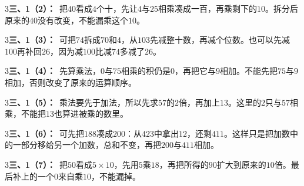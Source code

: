 \documentclass[multi=snippet,border={5bp 20bp 5bp 5bp}]{standalone}
\newenvironment{snippet}[3]{\begin{minipage}{#1bp}\color{answerred}\fontsize{#2}{#3}\selectfont\raggedright}{\end{minipage}}
\begin{document}
\begin{snippet}{505}{11.5}{14}\begin{multicols}{3}\raggedcolumns \textbf{三、1（2）：}\ 把\(40\)\allowbreak 看成\(4\)\allowbreak 个十，先让\(4\)\allowbreak 与\(25\)\allowbreak 相乘凑成一百，再乘剩下的\(10\)\allowbreak 。拆分后原来的\(40\)\allowbreak 没有改变，不能漏乘这个\(10\)\allowbreak 。\end{multicols}\end{snippet}
\begin{snippet}{505}{11.5}{14}\begin{multicols}{3}\raggedcolumns \textbf{三、1（3）：}\ 可把\(74\)\allowbreak 拆成\(70\)\allowbreak 和\(4\)\allowbreak ，从\(103\)\allowbreak 先减整十数，再减个位数。也可以先减\(100\)\allowbreak 再补回\(26\)\allowbreak ，因为减\(100\)\allowbreak 比减\(74\)\allowbreak 多减了\(26\)\allowbreak 。\end{multicols}\end{snippet}
\begin{snippet}{505}{11.5}{14}\begin{multicols}{3}\raggedcolumns \textbf{三、1（4）：}\ 先算乘法，\(0\)\allowbreak 与\(75\)\allowbreak 相乘的积仍是\(0\)\allowbreak ，再把它与\(9\)\allowbreak 相加。不能先把\(75\)\allowbreak 与\(9\)\allowbreak 相加，否则改变了原来的运算顺序。\end{multicols}\end{snippet}
\begin{snippet}{505}{11.5}{14}\begin{multicols}{3}\raggedcolumns \textbf{三、1（5）：}\ 乘法要先于加法，所以先求\(57\)\allowbreak 的\(2\)\allowbreak 倍，再加上\(13\)\allowbreak 。这里的\(2\)\allowbreak 只与\(57\)\allowbreak 相乘，不能把\(13\)\allowbreak 也算进被乘的数里。\end{multicols}\end{snippet}
\begin{snippet}{505}{11.5}{14}\begin{multicols}{3}\raggedcolumns \textbf{三、1（6）：}\ 可先把\(188\)\allowbreak 凑成\(200\)\allowbreak ：从\(423\)\allowbreak 中拿出\(12\)\allowbreak ，还剩\(411\)\allowbreak 。这样只是把加数中的一部分移给另一个加数，总和不变，再把\(200\)\allowbreak 与\(411\)\allowbreak 相加。\end{multicols}\end{snippet}
\begin{snippet}{505}{11.5}{14}\begin{multicols}{3}\raggedcolumns \textbf{三、1（7）：}\ 把\(50\)\allowbreak 看成\(5\times10\)\allowbreak ，先用\(5\)\allowbreak 乘\(18\)\allowbreak ，再把所得的\(90\)\allowbreak 扩大到原来的\(10\)\allowbreak 倍。最后补上的一个\(0\)\allowbreak 来自乘\(10\)\allowbreak ，不能漏掉。\end{multicols}\end{snippet}
\end{document}
